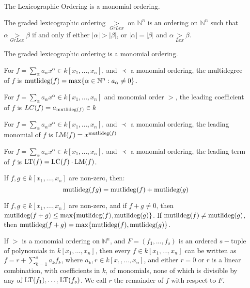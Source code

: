 \documentclass[../main.tex]{subfiles}
\begin{document}
%
\begin{theorem}
The Lexicographic Ordering is a monomial ordering.
\end{theorem}
%
\begin{definition}
The graded lexicographic ordering $\underset{GrLex}{>}$ on $\mathbb{N}^n$ is an ordering on $\mathbb{N}^n$ such that $\alpha \underset{GrLex}{>}\beta$ if and only if either $|\alpha|>|\beta|$, or $|\alpha| = |\beta|$ and $\alpha \underset{Lex}{>}\beta$.
\end{definition}
%
\begin{theorem}
The graded lexicographic ordering is a monomial ordering.
\end{theorem}
%
\begin{definition}
For $f=\sum_{\alpha} a_{\alpha} x^\alpha \in k[x_1,\hdots ,x_n]$, and $\prec$ a monomial ordering, the multidegree of $f$ is $\operatorname{mutlideg}(f) = \max\{\alpha\in\mathbb{N}^n: a_{\alpha} \ne 0\}$.
\end{definition}
%
\begin{definition}
For $f=\sum_{\alpha}a_\alpha x^\alpha \in k[x_1,\hdots ,x_n]$ and monomial order $>$, the leading coefficient of $f$ is $LC(f) =a_{\operatorname{mutlideg}(f)}\in k$
\end{definition}
%
\begin{definition}
For $f=\sum_{\alpha} a_{\alpha} x^\alpha \in k[x_1,\hdots ,x_n]$, and $\prec$ a monomial ordering, the leading monomial of $f$ is $\operatorname{LM}(f) = x^{\operatorname{mutlideg}(f)}$
\end{definition}
%
\begin{definition}
For $f=\sum_{\alpha} a_{\alpha} x^{\alpha} \in k[x_1,\hdots ,x_n]$, and $\prec$ a monomial ordering, the leading term of $f$ is $\operatorname{LT}(f) = \operatorname{LC}(f)\cdot \operatorname{LM}(f)$.
\end{definition}
%
\begin{theorem}
If $f,g\in k[x_1,\hdots ,x_n]$ are non-zero, then:
\begin{equation*}
    \operatorname{mutlideg}(fg) = \operatorname{mutlideg}(f)+\operatorname{mutlideg}(g)
\end{equation*}
\end{theorem}
%
\begin{theorem}
If $f,g\in k[x_1,\hdots ,x_n]$ are non-zero, and if $f+g \ne 0$, then $\operatorname{mutlideg}(f+g) \leq \max\{\operatorname{mutlideg}(f),\operatorname{mutlideg}(g)\}$. If $\operatorname{mutlideg}(f)\ne \operatorname{mutlideg}(g)$, then $\operatorname{mutlideg}(f+g) = \max\{\operatorname{mutlideg}(f),\operatorname{mutlideg}(g)\}$.
\end{theorem}
%
\begin{theorem}
If $>$ is a monomial ordering on $\mathbb{N}^n$, and $F = (f_1,\hdots, f_s)$ is an ordered $s-$tuple of polynomials in $k[x_1,\hdots ,x_n]$, then every $f\in k[x_1,\hdots ,x_n]$ can be written as $f = r+\sum_{k=1}^{s} a_k f_k$, where $a_k,r\in k[x_1,\hdots ,x_n]$, and either $r=0$ or $r$ is a linear combination, with coefficients in $k$, of monomials, none of which is divisible by any of $\operatorname{LT}(f_1),\hdots, \operatorname{LT}(f_s)$. We call $r$ the remainder of $f$ with respect to $F$.
\end{theorem}
\end{document}

